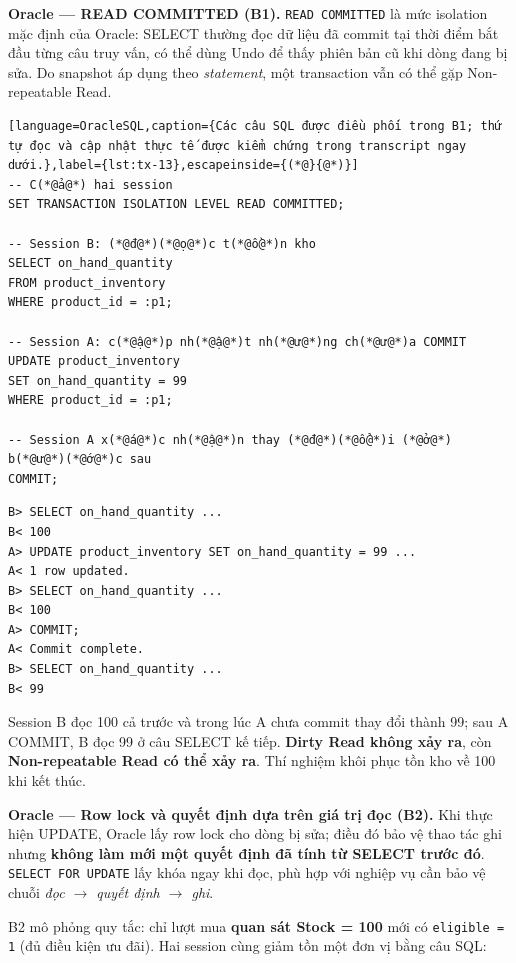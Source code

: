 \textbf{Oracle — READ COMMITTED (B1).} \texttt{READ COMMITTED} là mức isolation mặc định của Oracle: SELECT thường đọc dữ liệu đã commit tại thời điểm bắt đầu từng câu truy vấn, có thể dùng Undo để thấy phiên bản cũ khi dòng đang bị sửa. Do snapshot áp dụng theo \emph{statement}, một transaction vẫn có thể gặp Non-repeatable Read.

\begin{lstlisting}[language=OracleSQL,caption={Các câu SQL được điều phối trong B1; thứ tự đọc và cập nhật thực tế được kiểm chứng trong transcript ngay dưới.},label={lst:tx-13},escapeinside={(*@}{@*)}]
-- C(*@ả@*) hai session
SET TRANSACTION ISOLATION LEVEL READ COMMITTED;

-- Session B: (*@đ@*)(*@ọ@*)c t(*@ồ@*)n kho
SELECT on_hand_quantity
FROM product_inventory
WHERE product_id = :p1;

-- Session A: c(*@ậ@*)p nh(*@ậ@*)t nh(*@ư@*)ng ch(*@ư@*)a COMMIT
UPDATE product_inventory
SET on_hand_quantity = 99
WHERE product_id = :p1;

-- Session A x(*@á@*)c nh(*@ậ@*)n thay (*@đ@*)(*@ổ@*)i (*@ở@*) b(*@ư@*)(*@ớ@*)c sau
COMMIT;
\end{lstlisting}

\begingroup
{}\label{result:tx-8}
\nopagebreak[4]
\begin{Verbatim}
B> SELECT on_hand_quantity ...
B< 100
A> UPDATE product_inventory SET on_hand_quantity = 99 ...
A< 1 row updated.
B> SELECT on_hand_quantity ...
B< 100
A> COMMIT;
A< Commit complete.
B> SELECT on_hand_quantity ...
B< 99
\end{Verbatim}
\endgroup\par\smallskip
Session B đọc 100 cả trước và trong lúc A chưa commit thay đổi thành 99; sau A COMMIT, B đọc 99 ở câu SELECT kế tiếp. \textbf{Dirty Read không xảy ra}, còn \textbf{Non-repeatable Read có thể xảy ra}. Thí nghiệm khôi phục tồn kho về 100 khi kết thúc.

\textbf{Oracle — Row lock và quyết định dựa trên giá trị đọc (B2).} Khi thực hiện UPDATE, Oracle lấy row lock cho dòng bị sửa; điều đó bảo vệ thao tác ghi nhưng \textbf{không làm mới một quyết định đã tính từ SELECT trước đó}. \texttt{SELECT FOR UPDATE} lấy khóa ngay khi đọc, phù hợp với nghiệp vụ cần bảo vệ chuỗi \emph{đọc \(\rightarrow\) quyết định \(\rightarrow\) ghi}.

B2 mô phỏng quy tắc: chỉ lượt mua \textbf{quan sát Stock = 100} mới có \texttt{eligible =\allowbreak{} 1} (đủ điều kiện ưu đãi). Hai session cùng giảm tồn một đơn vị bằng câu SQL:

